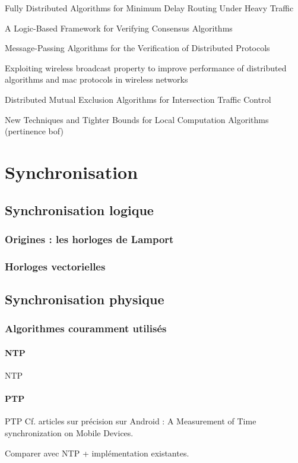 Fully Distributed Algorithms for Minimum Delay Routing Under Heavy Traffic 

A Logic-Based Framework for Verifying Consensus Algorithms

Message-Passing Algorithms for the Verification of Distributed Protocols

Exploiting wireless broadcast property to improve performance of distributed algorithms and mac protocols in wireless networks

Distributed Mutual Exclusion Algorithms for Intersection Traffic Control

New Techniques and Tighter Bounds for Local Computation Algorithms (pertinence bof)

\section{Synchronisation}

\subsection{Synchronisation logique}
\subsubsection{Origines : les horloges de Lamport}
\subsubsection{Horloges vectorielles}

\subsection{Synchronisation physique}
\subsubsection{Algorithmes couramment utilisés}
\paragraph{NTP}
\ac{NTP}
\paragraph{PTP}
\ac{PTP}
Cf. articles sur précision sur Android : 
A Measurement of Time synchronization on Mobile Devices.

Comparer avec NTP + implémentation existantes.

